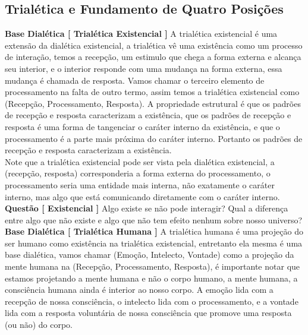 \subsection{Trialética e Fundamento de Quatro Posições}

\hspace{\baselineskip}

\textbf{Base Dialética [ Trialética Existencial ]} A trialética existencial é uma extensão da dialética existencial, a trialética vê uma existência como um processo de interação, temos a recepção, um estimulo que chega a forma externa e alcança seu interior, e o interior responde com uma mudança na forma externa, essa mudança é chamada de resposta. Vamos chamar o terceiro elemento de processamento na falta de outro termo, assim temos a trialética existencial como (Recepção, Processamento, Resposta). A propriedade estrutural é que os padrões de recepção e resposta caracterizam a existência, que os padrões de recepção e resposta é uma forma de tangenciar o caráter interno da existência, e que o processamento é a parte mais próxima do caráter interno. Portanto os padrões de recepção e resposta caracterizam a existência. \\

Note que a trialética existencial pode ser vista pela dialética existencial, a (recepção, resposta) corresponderia a forma externa do processamento, o processamento seria uma entidade mais interna, não exatamente o caráter interno, mas algo que está comunicando diretamente com o caráter interno.\\

\textbf{Questão [ Existencial ]} Algo existe se não pode interagir? Qual a diferença entre algo que não existe e algo que não tem efeito nenhum sobre nosso universo? \\

\textbf{Base Dialética [ Trialética Humana ]} A trialética humana é uma projeção do ser humano como existência na trialética existencial, entretanto ela mesma é uma base dialética, vamos chamar (Emoção, Intelecto, Vontade) como a projeção da mente humana na (Recepção, Processamento, Resposta), é importante notar que estamos projetando a mente humana e não o corpo humano, a mente humana, a consciência humana ainda é interior ao nosso corpo. A emoção lida com a recepção de nossa consciência, o intelecto lida com o processamento, e a vontade lida com a resposta voluntária de nossa consciência que promove uma resposta (ou não) do corpo.\\

